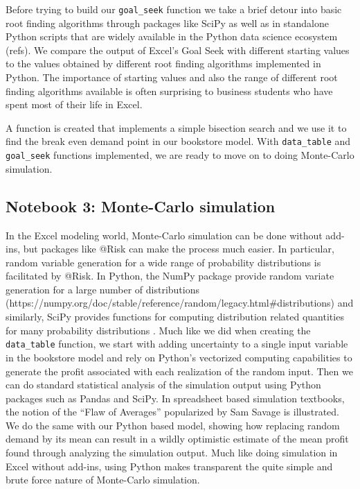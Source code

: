 \documentclass[ited,blindrev]{informs3}              %
\newcommand{\code}[1]{\texttt{#1}}
\begin{document}
Before trying to build our \code{goal_seek} function we take a brief detour into basic root finding algorithms through packages like SciPy as well as in standalone Python scripts that are widely available in the Python data science ecosystem (refs). We compare the output of Excel's Goal Seek with different starting values to the values obtained by different root finding algorithms implemented in Python. The importance of starting values and also the range of different root finding algorithms available is often surprising to business students who have spent most of their life in Excel.

A \code{} function is created that implements a simple bisection search and we use it to find the break even demand point in our bookstore model. With \code{data_table} and \code{goal_seek} functions implemented, we are ready to move on to doing Monte-Carlo simulation.

\subsection{Notebook 3: Monte-Carlo simulation}

In the Excel modeling world, Monte-Carlo simulation can be done without add-ins, but packages like @Risk \cite{} can make the process much easier. In particular, random variable generation for a wide range of probability distributions is facilitated by @Risk. In Python, the NumPy package provide random variate generation for a large number of distributions (https://numpy.org/doc/stable/reference/random/legacy.html#distributions) and similarly, SciPy provides functions for computing distribution related quantities for many probability distributions \cite{}. Much like we did when creating the \code{data_table} function, we start with adding uncertainty to a single input variable in the bookstore model and rely on Python's vectorized computing capabilities to generate the profit associated with each realization of the random input. Then we can do standard statistical analysis of the simulation output using Python packages such as Pandas and SciPy. In spreadsheet based simulation textbooks, the notion of the ``Flaw of Averages'' popularized by Sam Savage \cite{} is illustrated. We do the same with our Python based model, showing how replacing random demand by its mean can result in a wildly optimistic estimate of the mean profit found through analyzing the simulation output. Much like doing simulation in Excel without add-ins, using Python makes transparent the quite simple and brute force nature of Monte-Carlo simulation.
\end{document}
